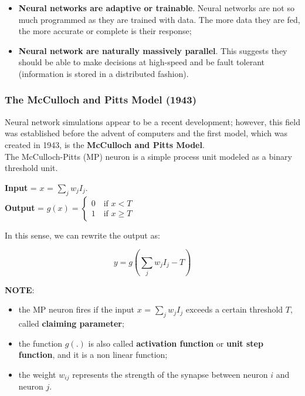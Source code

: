\begin{itemize}
	\item \textbf{Neural networks are adaptive or trainable}. Neural networks are not so much programmed as they are trained with data. The more data they are fed, the more accurate or complete is their response;
	\item \textbf{Neural network are naturally massively parallel}. This suggests they should be able to make decisions at high-speed and be fault tolerant (information is stored in a distributed fashion). 
\end{itemize}

\subsubsection{The McCulloch and Pitts Model (1943)}

Neural network simulations appear to be a recent development; however, this field was established before the advent of computers and the first model, which was created in 1943, is the \textbf{McCulloch and Pitts Model}.\\
The McCulloch-Pitts (MP) neuron is a simple process unit modeled as a binary threshold unit.



\textbf{Input} = $x$ = $\sum_j w_jI_j$. \\
\textbf{Output} = $g(x) = \begin{cases}
0 \quad \text{if }x<T\\
1 \quad \text{if }x \geq T
\end{cases}$

In this sense, we can rewrite the output as:

$$
y = g\left(\sum_j w_jI_j - T\right) 
$$

\textbf{NOTE}:

\begin{itemize}
    \item the MP neuron fires if the input $x$ = $\sum_j w_jI_j$ exceeds a certain threshold $T$, called \textbf{claiming parameter};

    \item the function $g(.)$ is also called \textbf{activation function} or \textbf{unit step function}, and it is a non linear function;

    \item the weight $w_{ij}$ represents the strength of the synapse between neuron $i$ and neuron $j$. 
\end{itemize}

